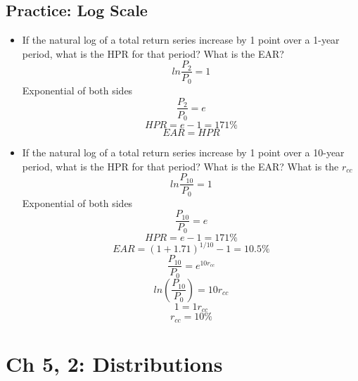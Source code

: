 \documentclass[11pt]{article}
\theoremstyle{definition}
\begin{document}
    \begin{shaded}
    \subsection{Practice: Log Scale}
    \begin{itemize}
        \item If the natural log of a total return series increase by 1 point over a 1-year period, what is the HPR for that period?   What is the EAR?\\
            \vspace{1em}
            $$ln{\frac{P_2}{P_0}} = 1$$
            Exponential of both sides
            $$\frac{P_2}{P_0} = e$$
            $$HPR = e - 1 = 171\%$$
            $$EAR = HPR$$
            \item If the natural log of a total return series increase by 1 point over a 10-year period, what is the HPR for that period?   What is the EAR?  What is the $r_{cc}$\\
            \vspace{1em}
            $$ln{\frac{P_{10}}{P_0}} = 1$$
            Exponential of both sides
            $$\frac{P_{10}}{P_0} = e$$
            $$HPR = e - 1 = 171\%$$
            $$EAR = (1+1.71)^{1/10} - 1 = 10.5\%$$
             $$\frac{P_{10}}{P_0} = e^{10r_{cc}}$$
             $$ln(\frac{P_{10}}{P_0}) = 10r_{cc}$$
             $$1 = 1r_{cc}$$
             $$r_{cc} = 10\%$$
    \end{itemize}
    \end{shaded}


\section{ Ch 5, 2: Distributions}
\end{document}
